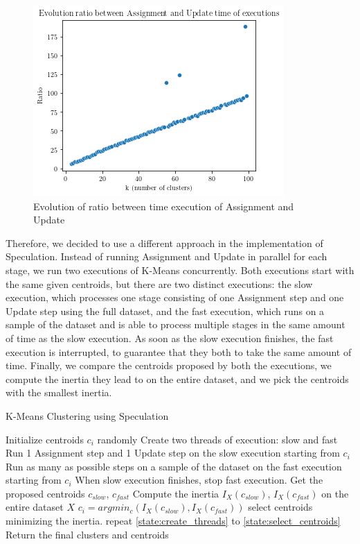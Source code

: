 \begin{figure}[h]
\centering
\includegraphics[width=\linewidth]{./plots/ratio_k.png}
\caption{Evolution of ratio between time execution of Assignment and Update}
\label{fig:ratio_k}
\end{figure}

Therefore, we decided to use a different approach in the implementation of Speculation. Instead of running Assignment and Update in parallel for each stage, we run two executions of K-Means concurrently. Both executions start with the same given centroids, but there are two distinct executions: the slow execution, which processes one stage consisting of one Assignment step and one Update step using the full dataset, and the fast execution, which runs on a sample of the dataset and is able to process multiple stages in the same amount of time as the slow execution. As soon as the slow execution finishes, the fast execution is interrupted, to guarantee that they both to take the same amount of time.
Finally, we compare the centroids proposed by both the executions, we compute the inertia they lead to on the entire dataset, and we pick the centroids with the smallest inertia.
\begin{algorithm}
\caption{K-Means Clustering using Speculation}
\begin{algorithmic}[1]
\State Initialize centroids $c_i$ randomly
\State Create two threads of execution: slow and fast
\label{state:create_threads}
\State Run 1 Assignment step and 1 Update step on the slow execution starting from $c_i$
\State Run as many as possible steps on a sample of the dataset on the fast execution starting from $c_i$
\State When slow execution finishes, stop fast execution. Get the proposed centroids $c_{slow}$, $c_{fast}$
\State Compute the inertia $I_X(c_{slow})$, $I_X(c_{fast})$ on the entire dataset $X$
\State $c_i = argmin_c(I_X(c_{slow}), I_X(c_{fast}))$ select centroids minimizing the inertia.
\label{state:select_centroids}
    \State repeat \ref{state:create_threads} to \ref{state:select_centroids}
\EndWhile
\State Return the final clusters and centroids
\end{algorithmic}
\end{algorithm}

